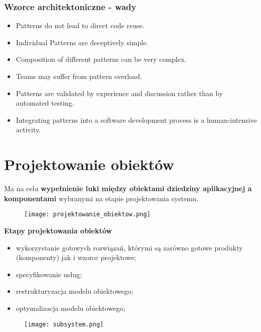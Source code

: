 \documentclass[a4paper]{article}
\begin{document}
    \subsubsection{Wzorce architektoniczne - wady}
    \begin{itemize}
        \item Patterns do not lead to direct code reuse.
        \item Individual Patterns are deceptively simple.
        \item Composition of different patterns can be very complex.
        \item Teams may suffer from pattern overload.
        \item Patterns are validated by experience and discussion
        rather than by automated testing.
        \item Integrating patterns into a software development
        process is a human-intensive activity.
    \end{itemize}


    \section{Projektowanie obiektów}
    Ma na celu \textbf{wypełnienie luki między obiektami dziedziny aplikacyjnej a komponentami} wybranymi na etapie projektowania systemu.


    \begin{figure}[h]
        \texttt{[image: projektowanie\_obiektow.png]}
    \end{figure}

    \textbf{Etapy projektowania obiektów}
    \begin{itemize}
        \item wykorzystanie gotowych rozwiązań, którymi są zarówno
        gotowe produkty (komponenty) jak i wzorce projektowe;
        \item specyfikowanie usług;
        \item restrukturyzacja modelu obiektowego;
        \item optymalizacja modelu obiektowego;
    \end{itemize}

    \begin{figure}[H]
        \texttt{[image: subsystem.png]}
    \end{figure}
\end{document}
